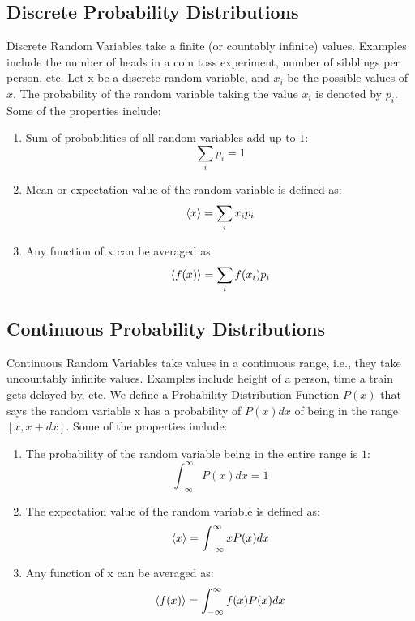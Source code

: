 \documentclass[12pt, oneside]{book}
\DeclarePairedDelimiter{\evdel}{\langle}{\rangle}
\newcommand{\ev}{\evdel}
\begin{document}
\subsection{Discrete Probability Distributions}
Discrete Random Variables take a finite (or countably infinite) values.
Examples include the number of heads in a coin toss experiment, number of sibblings per person, etc.
Let x be a discrete random variable, and \(x_i\) be the possible values of \(x\).
The probability of the random variable taking the value \(x_i\) is denoted by \(p_i\).
Some of the properties include:
\begin{enumerate}
    \item Sum of probabilities of all random variables add up to \(1\):
    \[\sum_{i} p_i = 1\]
    \item Mean or expectation value of the random variable is defined as:
    \[ \ev{x} = \sum_{i} x_i p_i \]
    \item Any function of x can be averaged as:
    \[ \ev{f(x)} = \sum_{i} f(x_i) p_i \]
\end{enumerate}

\subsection{Continuous Probability Distributions}
Continuous Random Variables take values in a continuous range, i.e., they take uncountably infinite values.
Examples include height of a person, time a train gets delayed by, etc.
We define a Probability Distribution Function \(P(x)\) that says the random variable x has a probability of \(P(x)dx\) of being in the range \([x, x+dx]\).
Some of the properties include:
\begin{enumerate}
    \item The probability of the random variable being in the entire range is \(1\):
    \[ \int_{-\infty}^{\infty} P(x)dx = 1 \]
    \item The expectation value of the random variable is defined as:
    \[ \ev{x} = \int_{-\infty}^{\infty} xP(x)dx \]
    \item Any function of x can be averaged as:
    \[ \ev{f(x)} = \int_{-\infty}^{\infty} f(x)P(x)dx \]
\end{enumerate}
\end{document}
